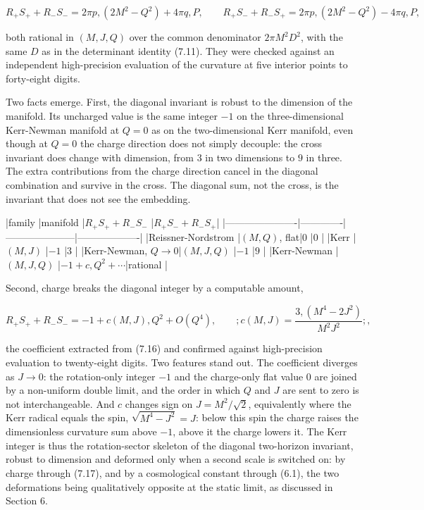 \documentclass[11pt]{article}
\begin{document}
\begin{equation*}
R_+ S_+ + R_- S_- = 2\pi p,(2M^2 - Q^2) + 4\pi q,P, \qquad R_+ S_- + R_- S_+ = 2\pi p,(2M^2 - Q^2) - 4\pi q,P ,
\tag{7.16}
\end{equation*}

both rational in $(M,J,Q)$ over the common denominator $2\pi M^2 D^2$, with the same $D$ as in the determinant identity (7.11). They were checked against an independent high-precision evaluation of the curvature at five interior points to forty-eight digits.

Two facts emerge. First, the diagonal invariant is robust to the dimension of the manifold. Its uncharged value is the same integer $-1$ on the three-dimensional Kerr-Newman manifold at $Q = 0$ as on the two-dimensional Kerr manifold, even though at $Q = 0$ the charge direction does not simply decouple: the cross invariant does change with dimension, from $3$ in two dimensions to $9$ in three. The extra contributions from the charge direction cancel in the diagonal combination and survive in the cross. The diagonal sum, not the cross, is the invariant that does not see the embedding.

|family                |manifold     |$R_+ S_+ + R_- S_-$  |$R_+ S_- + R_- S_+$|
|----------------------|-------------|---------------------|-------------------|
|Reissner-Nordstrom    |$(M,Q)$, flat|$0$                  |$0$                |
|Kerr                  |$(M,J)$      |$-1$                 |$3$                |
|Kerr-Newman, $Q \to 0$|$(M,J,Q)$    |$-1$                 |$9$                |
|Kerr-Newman           |$(M,J,Q)$    |$-1 + c,Q^2 + \cdots$|rational           |

Second, charge breaks the diagonal integer by a computable amount,

\begin{equation*}
R_+ S_+ + R_- S_- = -1 + c(M,J),Q^2 + O(Q^4), \qquad \boxed{;c(M,J) = \frac{3,(M^4 - 2J^2)}{M^2 J^2};} ,
\tag{7.17}
\end{equation*}

the coefficient extracted from (7.16) and confirmed against high-precision evaluation to twenty-eight digits. Two features stand out. The coefficient diverges as $J \to 0$: the rotation-only integer $-1$ and the charge-only flat value $0$ are joined by a non-uniform double limit, and the order in which $Q$ and $J$ are sent to zero is not interchangeable. And $c$ changes sign on $J = M^2/\sqrt{2}$, equivalently where the Kerr radical equals the spin, $\sqrt{M^4 - J^2} = J$: below this spin the charge raises the dimensionless curvature sum above $-1$, above it the charge lowers it. The Kerr integer is thus the rotation-sector skeleton of the diagonal two-horizon invariant, robust to dimension and deformed only when a second scale is switched on: by charge through (7.17), and by a cosmological constant through (6.1), the two deformations being qualitatively opposite at the static limit, as discussed in Section 6.
\end{document}
